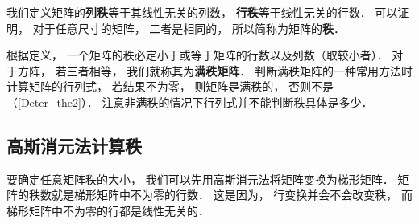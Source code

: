 

我们定义矩阵的\textbf{列秩}等于其线性无关的列数， \textbf{行秩}等于线性无关的行数． 可以证明， 对于任意尺寸的矩阵， 二者是相同的， 所以简称为矩阵的\textbf{秩}．

根据定义， 一个矩阵的秩必定小于或等于矩阵的行数以及列数（取较小者）． 对于方阵， 若三者相等， 我们就称其为\textbf{满秩矩阵}． 判断满秩矩阵的一种常用方法时计算矩阵的行列式， 若结果不为零， 则矩阵是满秩的， 否则不是（\autoref{Deter_the2}）． 注意非满秩的情况下行列式并不能判断秩具体是多少．


\subsection{高斯消元法计算秩}
要确定任意矩阵秩的大小， 我们可以先用高斯消元法将矩阵变换为梯形矩阵． 矩阵的秩数就是梯形矩阵中不为零的行数． 这是因为， 行变换并会不会改变秩， 而梯形矩阵中不为零的行都是线性无关的．
